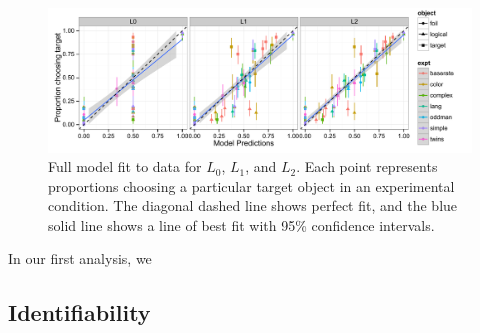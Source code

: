  \begin{figure}[t]
  \centering
  \includegraphics[width=6in]{../plots/models-1.pdf}
  \caption{\label{fig:models-2} Full model fit to data for $L_0$, $L_1$, and $L_2$. Each point represents proportions choosing a particular target object in an experimental condition. The diagonal dashed line shows perfect fit, and the blue solid line shows a line of best fit with 95\% confidence intervals.}
\end{figure}

In our first analysis, we 


\subsection{Identifiability}

